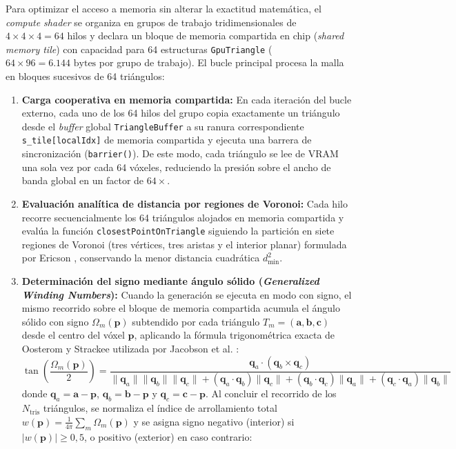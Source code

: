 Para optimizar el acceso a memoria sin alterar la exactitud matemática, el \textit{compute shader} se organiza en grupos de trabajo tridimensionales de $4 \times 4 \times 4 = 64$ hilos y declara un bloque de memoria compartida en chip (\textit{shared memory tile}) con capacidad para 64 estructuras \texttt{GpuTriangle} ($64 \times 96 = 6.144\text{ bytes}$ por grupo de trabajo). El bucle principal procesa la malla en bloques sucesivos de 64 triángulos:

\begin{enumerate}
  \item \textbf{Carga cooperativa en memoria compartida:} En cada iteración del bucle externo, cada uno de los 64 hilos del grupo copia exactamente un triángulo desde el \textit{buffer} global \texttt{TriangleBuffer} a su ranura correspondiente \texttt{s\_tile[localIdx]} de memoria compartida y ejecuta una barrera de sincronización (\texttt{barrier()}). De este modo, cada triángulo se lee de VRAM una sola vez por cada 64 vóxeles, reduciendo la presión sobre el ancho de banda global en un factor de $64\times$.
  \item \textbf{Evaluación analítica de distancia por regiones de Voronoi:} Cada hilo recorre secuencialmente los 64 triángulos alojados en memoria compartida y evalúa la función \texttt{closestPointOnTriangle} siguiendo la partición en siete regiones de Voronoi (tres vértices, tres aristas y el interior planar) formulada por Ericson \cite{ericson2004}, conservando la menor distancia cuadrática $d_{\min}^2$.
  \item \textbf{Determinación del signo mediante ángulo sólido (\textit{Generalized Winding Numbers}):} Cuando la generación se ejecuta en modo con signo, el mismo recorrido sobre el bloque de memoria compartida acumula el ángulo sólido con signo $\Omega_m(\mathbf{p})$ subtendido por cada triángulo $T_m = (\mathbf{a}, \mathbf{b}, \mathbf{c})$ desde el centro del vóxel $\mathbf{p}$, aplicando la fórmula trigonométrica exacta de Oosterom y Strackee utilizada por Jacobson et al. \cite{jacobson2013}:
  \begin{equation}
    \tan\!\left(\frac{\Omega_m(\mathbf{p})}{2}\right) = \frac{\mathbf{q}_a \cdot (\mathbf{q}_b \times \mathbf{q}_c)}{\|\mathbf{q}_a\|\|\mathbf{q}_b\|\|\mathbf{q}_c\| + (\mathbf{q}_a \cdot \mathbf{q}_b)\|\mathbf{q}_c\| + (\mathbf{q}_b \cdot \mathbf{q}_c)\|\mathbf{q}_a\| + (\mathbf{q}_c \cdot \mathbf{q}_a)\|\mathbf{q}_b\|}
  \end{equation}
  donde $\mathbf{q}_a = \mathbf{a} - \mathbf{p}$, $\mathbf{q}_b = \mathbf{b} - \mathbf{p}$ y $\mathbf{q}_c = \mathbf{c} - \mathbf{p}$. Al concluir el recorrido de los $N_{\text{tris}}$ triángulos, se normaliza el índice de arrollamiento total $w(\mathbf{p}) = \frac{1}{4\pi}\sum_{m} \Omega_m(\mathbf{p})$ y se asigna signo negativo (interior) si $|w(\mathbf{p})| \ge 0,5$, o positivo (exterior) en caso contrario:

\end{enumerate}
